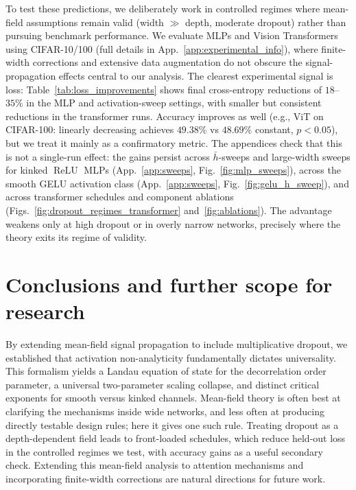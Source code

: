 \documentclass{article}
\DeclareMathOperator{\ReLU}{ReLU}
\newcommand{\relu}{\ensuremath{\ReLU}}
\theoremstyle{plain}
\theoremstyle{definition}
\theoremstyle{remark}
\begin{document}
To test these predictions, we deliberately work in controlled regimes where mean-field assumptions remain valid (width $\gg$ depth, moderate dropout) rather than pursuing benchmark performance. We evaluate MLPs and Vision Transformers \cite{dosovitskiy2021vit} using CIFAR-10/100 \cite{krizhevsky2009cifar} (full details in App.~\ref{app:experimental_info}), where finite-width corrections and extensive data augmentation do not obscure the signal-propagation effects central to our analysis. The clearest experimental signal is loss: Table~\ref{tab:loss_improvements} shows final cross-entropy reductions of \(18\)--\(35\%\) in the MLP and activation-sweep settings, with smaller but consistent reductions in the transformer runs. Accuracy improves as well (e.g., ViT on CIFAR-100: linearly decreasing achieves $49.38\%$ vs $48.69\%$ constant, $p < 0.05$), but we treat it mainly as a confirmatory metric. The appendices check that this is not a single-run effect: the gains persist across \(\bar h\)-sweeps and large-width sweeps for kinked \relu{} MLPs (App.~\ref{app:sweeps}, Fig.~\ref{fig:mlp_sweeps}), across the smooth GELU activation class (App.~\ref{app:sweeps}, Fig.~\ref{fig:gelu_h_sweep}), and across transformer schedules and component ablations (Figs.~\ref{fig:dropout_regimes_transformer} and~\ref{fig:ablations}). The advantage weakens only at high dropout or in overly narrow networks, precisely where the theory exits its regime of validity.










\section{Conclusions and further scope for research}
By extending mean-field signal propagation to include multiplicative dropout, we established that activation non-analyticity fundamentally dictates universality. This formalism yields a Landau equation of state for the decorrelation order parameter, a universal two-parameter scaling collapse, and distinct critical exponents for smooth versus kinked channels. Mean-field theory is often best at clarifying the mechanisms inside wide networks, and less often at producing directly testable design rules; here it gives one such rule. Treating dropout as a depth-dependent field leads to front-loaded schedules, which reduce held-out loss in the controlled regimes we test, with accuracy gains as a useful secondary check. Extending this mean-field analysis to attention mechanisms and incorporating finite-width corrections are natural directions for future work.
\end{document}
